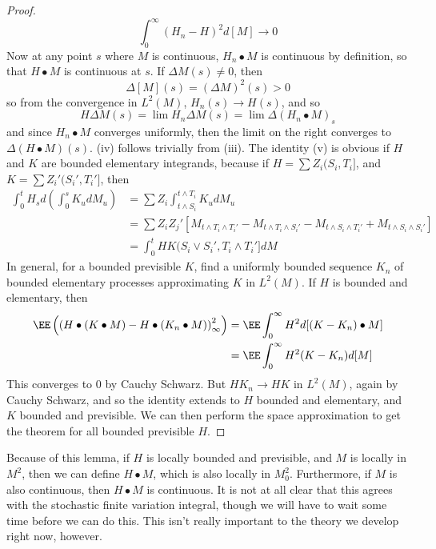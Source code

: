 \begin{proof}
    \[ \int_0^\infty (H_n - H)^2 d[M] \to 0 \]
    Now at any point $s$ where $M$ is continuous, $H_n \bullet M$ is continuous by definition, so that $H \bullet M$ is continuous at $s$. If $\Delta M(s) \neq 0$, then
    \[ \Delta [M](s) = (\Delta M)^2(s) > 0 \]
    so from the convergence in $L^2(M)$, $H_n(s) \to H(s)$, and so
    \[ H \Delta M(s) = \lim H_n \Delta M(s) = \lim \Delta (H_n \bullet M)_s \]
    and since $H_n \bullet M$ converges uniformly, then the limit on the right converges to $\Delta (H \bullet M)(s)$. (iv) follows trivially from (iii). The identity (v) is obvious if $H$ and $K$ are bounded elementary integrands, because if $H = \sum Z_i (S_i,T_i]$, and $K = \sum Z_i' (S_i',T_i']$, then
    \begin{align*}
        \int_0^t H_s d \left( \int_0^s K_u dM_u \right) &= \sum Z_i \int_{t \wedge S_i}^{t \wedge T_i} K_u dM_u\\
        &= \sum Z_iZ_j'[M_{t \wedge T_i \wedge T_i'} - M_{t \wedge T_i \wedge S_i'} - M_{t \wedge S_i \wedge T_i'} + M_{t \wedge S_i \wedge S_i'}]\\
        &= \int_0^t HK(S_i \vee S_i', T_i \wedge T_i'] dM
    \end{align*}
    In general, for a bounded previsible $K$, find a uniformly bounded sequence $K_n$ of bounded elementary processes approximating $K$ in $L^2(M)$. If $H$ is bounded and elementary, then
    \begin{align*}
        \EE \left( \left( H \bullet (K \bullet M) - H \bullet (K_n \bullet M) \right)^2_\infty \right) &= \EE \int_0^\infty H^2 d[(K - K_n) \bullet M]\\
        &= \EE \int_0^\infty H^2 (K - K_n) d[M]
    \end{align*}
    This converges to 0 by Cauchy Schwarz. But $HK_n \to HK$ in $L^2(M)$, again by Cauchy Schwarz, and so the identity extends to $H$ bounded and elementary, and $K$ bounded and previsible. We can then perform the space approximation to get the theorem for all bounded previsible $H$.
\end{proof}

Because of this lemma, if $H$ is locally bounded and previsible, and $M$ is locally in $M^2$, then we can define $H \bullet M$, which is also locally in $M^2_0$. Furthermore, if $M$ is also continuous, then $H \bullet M$ is continuous. It is not at all clear that this agrees with the stochastic finite variation integral, though we will have to wait some time before we can do this. This isn't really important to the theory we develop right now, however.

